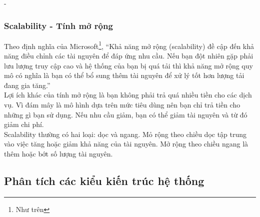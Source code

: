 \begin {list} {-}{}
\subsubsection{Scalability - Tính mở rộng}
\noindent Theo định nghĩa của Microsoft\footnote{Như trên}, “Khả năng mở rộng (scalability) đề cập đến khả năng điều chỉnh các tài nguyên để đáp ứng nhu cầu. Nếu bạn đột nhiên gặp phải lưu lượng truy cập cao và hệ thống của bạn bị quá tải thì khả năng mở rộng quy mô có nghĩa là bạn có thể bổ sung thêm tài nguyên để xử lý tốt hơn lượng tải đang gia tăng.” \\[0.5cm]
\noindent Lợi ích khác của tính mở rộng là bạn không phải trả quá nhiều tiền cho các dịch vụ. Vì đám mây là mô hình dựa trên mức tiêu dùng nên bạn chỉ trả tiền cho những gì bạn sử dụng. Nếu nhu cầu giảm, bạn có thể giảm tài nguyên và từ đó giảm chi phí. \\[0.5cm]
\noindent Scalability thường có hai loại: dọc và ngang. Mỏ rộng theo chiều dọc tập trung vào việc tăng hoặc giảm khả năng của tài nguyên. Mở rộng theo chiều ngang là thêm hoặc bớt số lượng tài nguyên.
\subsection{Phân tích các kiểu kiến trúc hệ thống}

\end{list}
